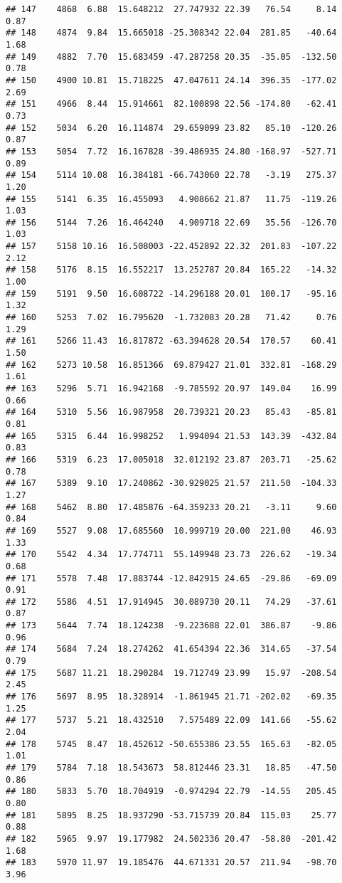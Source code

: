 \documentclass[]{article}
\begin{document}
\begin{verbatim}
## 147    4868  6.88  15.648212  27.747932 22.39   76.54     8.14  0.87
## 148    4874  9.84  15.665018 -25.308342 22.04  281.85   -40.64  1.68
## 149    4882  7.70  15.683459 -47.287258 20.35  -35.05  -132.50  0.78
## 150    4900 10.81  15.718225  47.047611 24.14  396.35  -177.02  2.69
## 151    4966  8.44  15.914661  82.100898 22.56 -174.80   -62.41  0.73
## 152    5034  6.20  16.114874  29.659099 23.82   85.10  -120.26  0.87
## 153    5054  7.72  16.167828 -39.486935 24.80 -168.97  -527.71  0.89
## 154    5114 10.08  16.384181 -66.743060 22.78   -3.19   275.37  1.20
## 155    5141  6.35  16.455093   4.908662 21.87   11.75  -119.26  1.03
## 156    5144  7.26  16.464240   4.909718 22.69   35.56  -126.70  1.03
## 157    5158 10.16  16.508003 -22.452892 22.32  201.83  -107.22  2.12
## 158    5176  8.15  16.552217  13.252787 20.84  165.22   -14.32  1.00
## 159    5191  9.50  16.608722 -14.296188 20.01  100.17   -95.16  1.32
## 160    5253  7.02  16.795620  -1.732083 20.28   71.42     0.76  1.29
## 161    5266 11.43  16.817872 -63.394628 20.54  170.57    60.41  1.50
## 162    5273 10.58  16.851366  69.879427 21.01  332.81  -168.29  1.61
## 163    5296  5.71  16.942168  -9.785592 20.97  149.04    16.99  0.66
## 164    5310  5.56  16.987958  20.739321 20.23   85.43   -85.81  0.81
## 165    5315  6.44  16.998252   1.994094 21.53  143.39  -432.84  0.83
## 166    5319  6.23  17.005018  32.012192 23.87  203.71   -25.62  0.78
## 167    5389  9.10  17.240862 -30.929025 21.57  211.50  -104.33  1.27
## 168    5462  8.80  17.485876 -64.359233 20.21   -3.11     9.60  0.84
## 169    5527  9.08  17.685560  10.999719 20.00  221.00    46.93  1.33
## 170    5542  4.34  17.774711  55.149948 23.73  226.62   -19.34  0.68
## 171    5578  7.48  17.883744 -12.842915 24.65  -29.86   -69.09  0.91
## 172    5586  4.51  17.914945  30.089730 20.11   74.29   -37.61  0.87
## 173    5644  7.74  18.124238  -9.223688 22.01  386.87    -9.86  0.96
## 174    5684  7.24  18.274262  41.654394 22.36  314.65   -37.54  0.79
## 175    5687 11.21  18.290284  19.712749 23.99   15.97  -208.54  2.45
## 176    5697  8.95  18.328914  -1.861945 21.71 -202.02   -69.35  1.25
## 177    5737  5.21  18.432510   7.575489 22.09  141.66   -55.62  2.04
## 178    5745  8.47  18.452612 -50.655386 23.55  165.63   -82.05  1.01
## 179    5784  7.18  18.543673  58.812446 23.31   18.85   -47.50  0.86
## 180    5833  5.70  18.704919  -0.974294 22.79  -14.55   205.45  0.80
## 181    5895  8.25  18.937290 -53.715739 20.84  115.03    25.77  0.88
## 182    5965  9.97  19.177982  24.502336 20.47  -58.80  -201.42  1.68
## 183    5970 11.97  19.185476  44.671331 20.57  211.94   -98.70  3.96

\end{verbatim}
\end{document}
